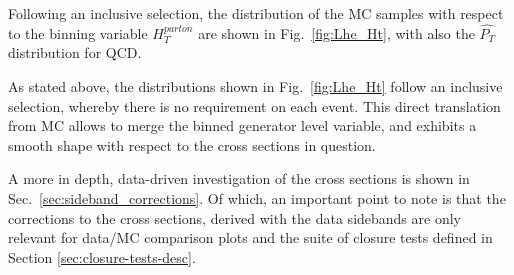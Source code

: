 Following an inclusive selection, the distribution of the MC samples with respect to the binning variable $H_{T}^{parton}$ are shown in Fig.~\ref{fig:Lhe_Ht}, with
also the $\hat{P_{T}}$ distribution for QCD.

As stated above, the distributions shown in Fig.~\ref{fig:Lhe_Ht} follow an inclusive selection, whereby there is no requirement on each event. This direct translation
from MC allows to merge the binned generator level variable, and exhibits a smooth shape with respect to the cross sections in question.

A more in depth, data-driven investigation of the cross sections is shown in Sec.~\ref{sec:sideband_corrections}. Of which, an important point to note is that
the corrections to the cross sections, derived with the data sidebands are only relevant for data/MC comparison plots and the suite of closure tests defined in Section \ref{sec:closure-tests-desc}.

